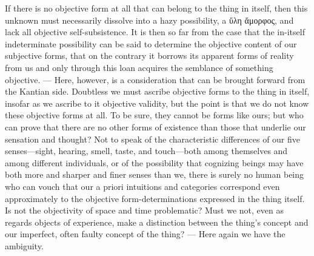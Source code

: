 \documentclass[12pt]{article}
\begin{document}
If there is no objective form at all that can belong to the thing in
itself, then this unknown must necessarily dissolve into a hazy
possibility, a ὕλη ἄμορφος, and lack all objective self-subsistence. It is
then so far from the case that the in-itself indeterminate possibility can
be said to determine the objective content of our subjective forms, that on
the contrary it borrows its apparent forms of reality from us and only
through this loan acquires the semblance of something objective. --- Here,
however, is a consideration that can be brought forward from the Kantian
side. Doubtless we must ascribe objective forms to the thing in itself,
insofar as we ascribe to it objective validity, but the point is that we do
not know these objective forms at all. To be sure, they cannot be forms
like ours; but who can prove that there are no other forms of existence
than those that underlie our sensation and thought? Not to speak of the
characteristic differences of our five senses—sight, hearing, smell, taste,
and touch—both among themselves and among different individuals, or of the
possibility that cognizing beings may have both more and sharper and finer
senses than we, there is surely no human being who can vouch that our a
priori intuitions and categories correspond even approximately to the
objective form-determinations expressed in
the thing itself. Is not the objectivity of space and time problematic?
Must we not, even as regards objects of experience, make a distinction
between the thing's concept and our imperfect, often faulty concept of the
thing? --- Here again we have the ambiguity.
\end{document}

